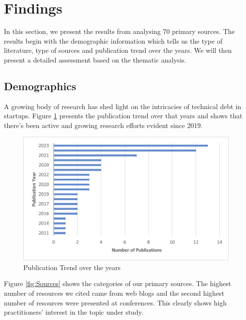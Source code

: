 \section{Findings}\label{Sec:Results}
In this section, we present the results from analysing 70 primary sources. The results begin with the demographic information which tells us the type of literature, type of sources and publication trend over the years. We will then present a detailed assessment based on the thematic analysis.

\subsection{Demographics}
A growing body of research has shed light on the intricacies of technical debt in startups. Figure \ref{fig:Trend} presents the publication trend over that years and shows that there's been active and growing research efforts evident since 2019.


\begin{figure}
  \includegraphics[width=\textwidth]{PublicationTrend.jpg}
  \caption{Publication Trend over the years}
 \label{fig:Trend}
\end{figure}

Figure \ref{fig:Sources} shows the categories of our primary sources. The highest number of resources we cited came from web blogs and the second highest number of resources were presented at conferences. This clearly shows high practitioners’ interest in the topic under study. 

